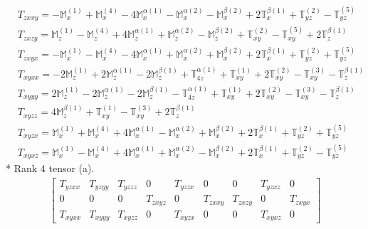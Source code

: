 \documentclass[fleqn,8pt,landscape]{jsarticle}
\begin{document}
\begin{align*}
& T_{zxxy} = - \mathbb{M}_{x}^{(1)} + \mathbb{M}_{x}^{(4)} - 4 \mathbb{M}_{x}^{\alpha(1)} - \mathbb{M}_{x}^{\alpha(2)} - \mathbb{M}_{x}^{\beta(2)} + 2 \mathbb{T}_{x}^{\beta(1)} + \mathbb{T}_{yz}^{(2)} - \mathbb{T}_{yz}^{(5)} \\
& T_{zxzy} = \mathbb{M}_{z}^{(1)} - \mathbb{M}_{z}^{(4)} + 4 \mathbb{M}_{z}^{\alpha(1)} + \mathbb{M}_{z}^{\alpha(2)} - \mathbb{M}_{z}^{\beta(2)} + \mathbb{T}_{xy}^{(2)} - \mathbb{T}_{xy}^{(5)} + 2 \mathbb{T}_{z}^{\beta(1)} \\
& T_{zxyx} = - \mathbb{M}_{x}^{(1)} - \mathbb{M}_{x}^{(4)} - 4 \mathbb{M}_{x}^{\alpha(1)} + \mathbb{M}_{x}^{\alpha(2)} + \mathbb{M}_{x}^{\beta(2)} + 2 \mathbb{T}_{x}^{\beta(1)} + \mathbb{T}_{yz}^{(2)} + \mathbb{T}_{yz}^{(5)} \\
& T_{xyxx} = - 2 \mathbb{M}_{z}^{(1)} + 2 \mathbb{M}_{z}^{\alpha(1)} - 2 \mathbb{M}_{z}^{\beta(1)} + \mathbb{T}_{4z}^{\alpha(1)} + \mathbb{T}_{xy}^{(1)} + 2 \mathbb{T}_{xy}^{(2)} - \mathbb{T}_{xy}^{(3)} - \mathbb{T}_{z}^{\beta(1)} \\
& T_{xyyy} = 2 \mathbb{M}_{z}^{(1)} - 2 \mathbb{M}_{z}^{\alpha(1)} - 2 \mathbb{M}_{z}^{\beta(1)} - \mathbb{T}_{4z}^{\alpha(1)} + \mathbb{T}_{xy}^{(1)} + 2 \mathbb{T}_{xy}^{(2)} - \mathbb{T}_{xy}^{(3)} - \mathbb{T}_{z}^{\beta(1)} \\
& T_{xyzz} = 4 \mathbb{M}_{z}^{\beta(1)} + \mathbb{T}_{xy}^{(1)} - \mathbb{T}_{xy}^{(3)} + 2 \mathbb{T}_{z}^{\beta(1)} \\
& T_{xyzx} = \mathbb{M}_{x}^{(1)} + \mathbb{M}_{x}^{(4)} + 4 \mathbb{M}_{x}^{\alpha(1)} - \mathbb{M}_{x}^{\alpha(2)} + \mathbb{M}_{x}^{\beta(2)} + 2 \mathbb{T}_{x}^{\beta(1)} + \mathbb{T}_{yz}^{(2)} + \mathbb{T}_{yz}^{(5)} \\
& T_{xyxz} = \mathbb{M}_{x}^{(1)} - \mathbb{M}_{x}^{(4)} + 4 \mathbb{M}_{x}^{\alpha(1)} + \mathbb{M}_{x}^{\alpha(2)} - \mathbb{M}_{x}^{\beta(2)} + 2 \mathbb{T}_{x}^{\beta(1)} + \mathbb{T}_{yz}^{(2)} - \mathbb{T}_{yz}^{(5)}
\end{align*}
* Rank 4 tensor (a).
\begin{align*}
\begin{bmatrix} T_{yzxx} & T_{yzyy} & T_{yzzz} & 0 & T_{yzzx} & 0 & 0 & T_{yzxz} & 0 \\ 0 & 0 & 0 & T_{zxyz} & 0 & T_{zxxy} & T_{zxzy} & 0 & T_{zxyx} \\ T_{xyxx} & T_{xyyy} & T_{xyzz} & 0 & T_{xyzx} & 0 & 0 & T_{xyxz} & 0 \end{bmatrix}
\end{align*}
\end{document}
